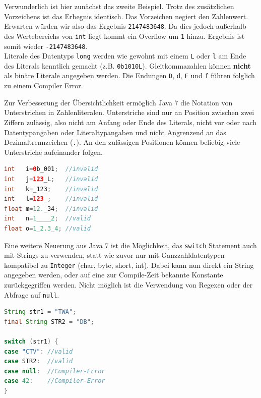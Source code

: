 \documentclass[times, 10pt,twocolumn]{article}
\begin{document}
Verwunderlich ist hier zunächst das zweite Beispiel. Trotz des zusätzlichen Vorzeichens ist das Erbegnis identisch. Das Vorzeichen negiert den Zahlenwert. Erwarten würden wir also das Ergebnis \texttt{2147483648}. Da dies jedoch außerhalb des Wertebereichs von \texttt{int} liegt kommt ein Overflow um \texttt{1} hinzu. Ergebnis ist somit wieder \texttt{-2147483648}.\\

Literale des Datentyps \texttt{long} werden wie gewohnt mit einem \texttt{L} oder \texttt{l} am Ende des Literals kenntlich gemacht (z.B. \texttt{0b1010L}). Gleitkommazahlen können \textbf{nicht} als binäre Literale angegeben werden. Die Endungen \texttt{D}, \texttt{d}, \texttt{F} und \texttt{f} führen folglich zu einem Compiler Error.

Zur Verbesserung der Übersichtlichkeit ermöglich Java 7 die Notation von Unterstrichen in Zahlenliteralen. Unterstriche sind nur an Position zwischen zwei Ziffern zulässig, also nicht am Anfang oder Ende des Literals, nicht vor oder nach Datentypangaben oder Literaltypangaben und nicht Angrenzend an das Dezimaltrennzeichen (\texttt{.}).\cite{apressjava} An den zulässigen Positionen können beliebig viele Unterstriche aufeinander folgen.\cite{heiseWasistNeu}

\begin{lstlisting}[language=java,breaklines=true]
int   i=0b_001;  //invalid
int   j=123_L;   //invalid
int   k=_123;    //invalid
int   l=123_;    //invalid
float m=12._34;  //invalid
int   n=1____2;  //valid
float o=1_2.3_4; //valid
\end{lstlisting}

Eine weitere Neuerung aus Java 7 ist die Möglichkeit, das \texttt{switch} Statement auch mit Strings zu verwenden, statt wie
zuvor nur mit Ganzzahldatentypen kompatibel zu \texttt{Integer} (char, byte, short, int). Dabei kann nun direkt ein String
angegeben werden, oder auf eine zur Compile-Zeit bekannte Konstante zurückgegriffen werden. Nicht möglich ist die Verwendung
von Regexen oder der Abfrage auf \texttt{null}.\cite{javainsel2}

\begin{lstlisting}[language=java,breaklines=true]
String str1 = "TWA";
final String STR2 = "DB";

switch (str1) {
case "CTV": //valid
case STR2:  //valid
case null:  //Compiler-Error
case 42:	//Compiler-Error
}
\end{lstlisting}
\end{document}
